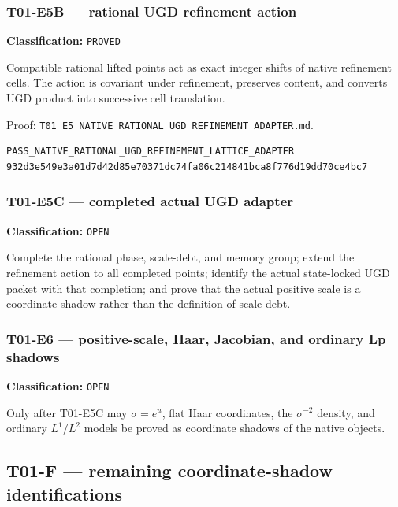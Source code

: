 \hypertarget{t01-e5b-rational-ugd-refinement-action}{%
\subsubsection{T01-E5B --- rational UGD refinement action}\label{t01-e5b-rational-ugd-refinement-action}}

\textbf{Classification:} \texttt{PROVED}

Compatible rational lifted points act as exact integer shifts of native
refinement cells. The action is covariant under refinement, preserves content,
and converts UGD product into successive cell translation.

Proof:
\texttt{T01\_E5\_NATIVE\_RATIONAL\_UGD\_REFINEMENT\_ADAPTER.md}.

\begin{verbatim}
PASS_NATIVE_RATIONAL_UGD_REFINEMENT_LATTICE_ADAPTER
932d3e549e3a01d7d42d85e70371dc74fa06c214841bca8f776d19dd70ce4bc7
\end{verbatim}

\hypertarget{t01-e5c-completed-actual-ugd-adapter}{%
\subsubsection{T01-E5C --- completed actual UGD adapter}\label{t01-e5c-completed-actual-ugd-adapter}}

\textbf{Classification:} \texttt{OPEN}

Complete the rational phase, scale-debt, and memory group; extend the refinement
action to all completed points; identify the actual state-locked UGD packet with
that completion; and prove that the actual positive scale is a coordinate shadow
rather than the definition of scale debt.

\hypertarget{t01-e6-positive-scale-haar-jacobian-and-ordinary-lp-shadows}{%
\subsubsection{T01-E6 --- positive-scale, Haar, Jacobian, and ordinary Lp shadows}\label{t01-e6-positive-scale-haar-jacobian-and-ordinary-lp-shadows}}

\textbf{Classification:} \texttt{OPEN}

Only after T01-E5C may \(\sigma=e^u\), flat Haar coordinates, the
\(\sigma^{-2}\) density, and ordinary \(L^1/L^2\) models be proved as coordinate
shadows of the native objects.

\hypertarget{t01-f-remaining-coordinate-shadow-identifications}{%
\subsection{T01-F --- remaining coordinate-shadow identifications}\label{t01-f-remaining-coordinate-shadow-identifications}}

